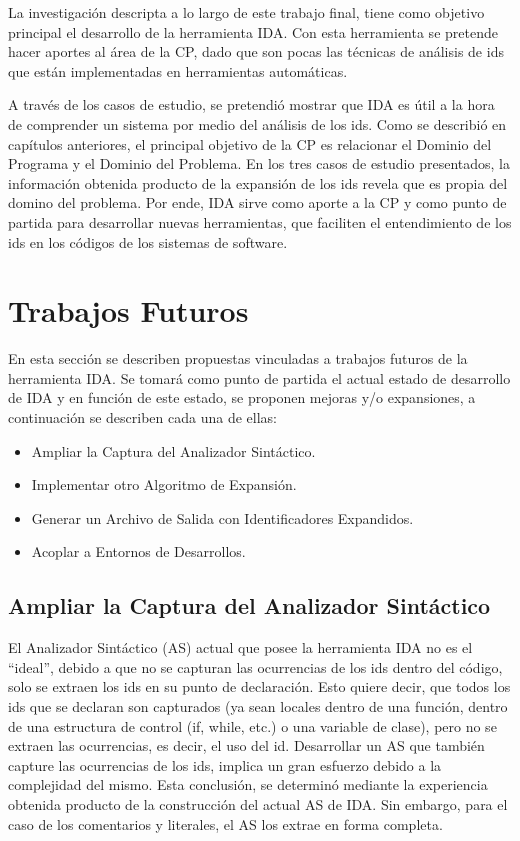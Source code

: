 La investigación descripta a lo largo de este trabajo final, tiene como objetivo principal el desarrollo de la herramienta IDA. Con esta herramienta se pretende hacer aportes al área de la CP, dado que son pocas las técnicas de análisis de ids que están implementadas en herramientas automáticas.

A través de los casos de estudio, se pretendió mostrar que IDA es útil a la hora de comprender un sistema por medio del análisis de los ids. Como se describió en capítulos anteriores, el principal objetivo de la CP es relacionar el Dominio del Programa y el Dominio del Problema. En los tres casos de estudio presentados, la información obtenida producto de la expansión de los ids revela que es propia del domino del problema. Por ende, IDA sirve como aporte a la CP y como punto de partida para desarrollar nuevas herramientas, que faciliten el entendimiento de los ids en los códigos de los sistemas de software.

\pagebreak
\section{Trabajos Futuros}

En esta sección se describen propuestas vinculadas a trabajos futuros de la herramienta IDA. Se tomará como punto de partida el actual estado de desarrollo de IDA y en función de este estado, se proponen mejoras y/o expansiones, a continuación se describen cada una de ellas:

\begin{itemize}

\item Ampliar la Captura del Analizador Sintáctico.

\item Implementar otro Algoritmo de Expansión.

\item Generar un Archivo de Salida con Identificadores Expandidos.

\item Acoplar a Entornos de Desarrollos.

\end{itemize}

\subsection{Ampliar la Captura del Analizador Sintáctico}

El Analizador Sintáctico (AS) actual que posee la herramienta IDA no es el “ideal”, debido a que no se capturan las ocurrencias de los ids dentro del código, solo se extraen los ids en su punto de declaración. Esto quiere decir, que todos los ids que se declaran son capturados (ya sean locales dentro de una función, dentro de una estructura de control (if, while, etc.) o una variable de clase), pero no se extraen las ocurrencias, es decir, el uso del id. Desarrollar un AS que también capture las ocurrencias de los ids, implica un gran esfuerzo debido a la complejidad del mismo. Esta conclusión, se determinó mediante la experiencia obtenida producto de la construcción del actual AS de IDA. Sin embargo, para el caso de los comentarios y literales, el AS los extrae en forma completa. 

